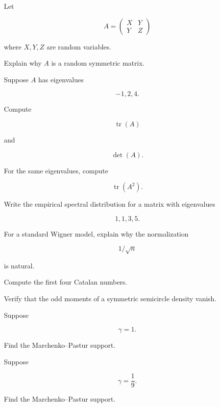 \begin{exercise}[2]
Let

\[
A
=
\begin{pmatrix}
X&Y\\
Y&Z
\end{pmatrix}
\]

where \(X,Y,Z\) are random variables.

Explain why \(A\) is a random symmetric matrix.
\end{exercise}

\begin{exercise}[2]
Suppose \(A\) has eigenvalues

\[
-1,2,4.
\]

Compute

\[
\operatorname{tr}(A)
\]

and

\[
\det(A).
\]
\end{exercise}

\begin{exercise}[2]
For the same eigenvalues, compute

\[
\operatorname{tr}(A^2).
\]
\end{exercise}

\begin{exercise}[2]
Write the empirical spectral distribution for a matrix with eigenvalues

\[
1,1,3,5.
\]
\end{exercise}

\begin{exercise}[2]
For a standard Wigner model, explain why the normalization

\[
1/\sqrt{n}
\]

is natural.
\end{exercise}

\begin{exercise}[2]
Compute the first four Catalan numbers.
\end{exercise}

\begin{exercise}[2]
Verify that the odd moments of a symmetric semicircle density vanish.
\end{exercise}

\begin{exercise}[2]
Suppose

\[
\gamma=1.
\]

Find the Marchenko--Pastur support.
\end{exercise}

\begin{exercise}[2]
Suppose

\[
\gamma=\frac19.
\]

Find the Marchenko--Pastur support.
\end{exercise}

